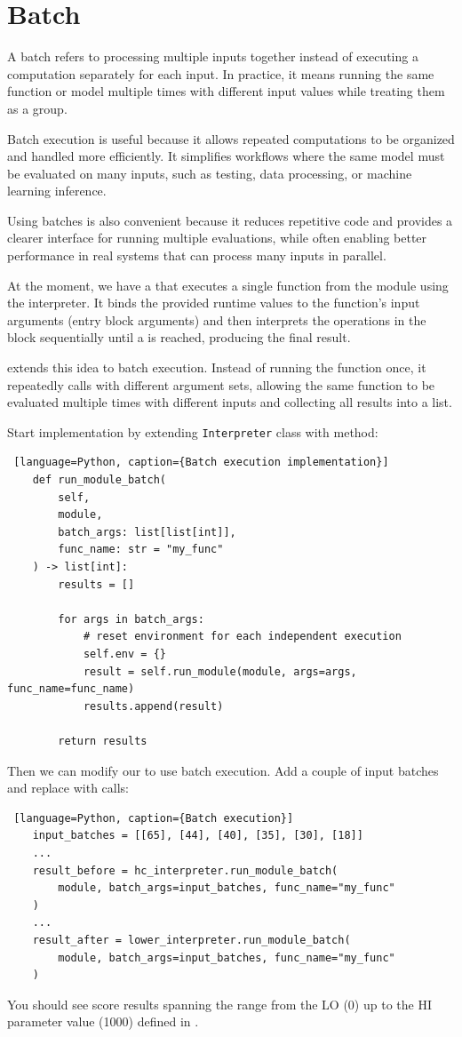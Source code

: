 \documentclass[../main.tex]{subfiles}
\begin{document}
\section{Batch}
A batch refers to processing multiple inputs together instead of executing a computation
separately for each input. In practice, it means running the same function or model multiple
times with different input values while treating them as a group.

Batch execution is useful because it allows repeated computations to be organized
and handled more efficiently. It simplifies workflows where the same model must be
evaluated on many inputs, such as testing, data processing, or machine learning inference.

Using batches is also convenient because it reduces repetitive code and provides
a clearer interface for running multiple evaluations, while often enabling better
performance in real systems that can process many inputs in parallel.

At the moment, we have a  that executes a single
function from the module using the interpreter.
It binds the provided runtime values to the function’s input arguments (entry
block arguments) and then interprets the operations in the block sequentially
until a  is reached, producing the final result.

 extends this idea to batch execution. Instead of running
the function once, it repeatedly calls  with different argument sets,
allowing the same function to be evaluated multiple times with different inputs
and collecting all results into a list.

Start implementation by extending \texttt{Interpreter} class with 
method:
\begin{lstlisting} [language=Python, caption={Batch execution implementation}]
    def run_module_batch(
        self,
        module,
        batch_args: list[list[int]],
        func_name: str = "my_func"
    ) -> list[int]:
        results = []

        for args in batch_args:
            # reset environment for each independent execution
            self.env = {}
            result = self.run_module(module, args=args, func_name=func_name)
            results.append(result)

        return results
\end{lstlisting}
Then we can modify our  to use batch execution. Add a couple of input batches
and replace  with  calls:
\begin{lstlisting} [language=Python, caption={Batch execution}]
    input_batches = [[65], [44], [40], [35], [30], [18]]
    ...
    result_before = hc_interpreter.run_module_batch(
        module, batch_args=input_batches, func_name="my_func"
    )
    ...
    result_after = lower_interpreter.run_module_batch(
        module, batch_args=input_batches, func_name="my_func"
    )
\end{lstlisting}

You should see score results spanning the range from the LO (0)
up to the HI parameter value (1000) defined in .
\end{document}

